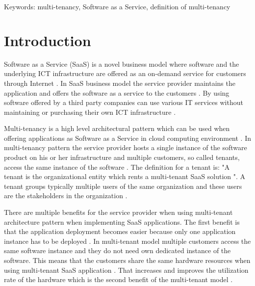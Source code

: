 \documentclass[conference]{sasmoota2017}
\begin{document}

Keywords: multi-tenancy, Software as a Service, definition of multi-tenancy



\IEEEpeerreviewmaketitle



\section{Introduction}

Software as a Service (SaaS) is a novel business model where software and the underlying ICT infrastructure are offered as an on-demand service for customers through Internet \cite{Bezemer:2010:MaintenanceDream}. In SaaS business model the service provider maintains the application and offers the software as a service to the customers \cite{Bezemer:2010:MaintenanceDream}. By using software offered by a third party companies can use various IT services without maintaining or purchasing their own ICT infrastructure \cite{Bezemer:2010:MaintenanceDream}. 

Multi-tenancy is a high level architectural pattern which can be used when offering applications as Software as a Service in cloud computing environment \cite{Kabbedijk2015:Defining}. In multi-tenancy pattern the service provider hosts a single instance of the software product on his or her infrastructure and multiple customers, so called tenants, access the same instance of the software \cite{Bezemer:2010:MaintenanceDream}. The definition for a tenant is: "A tenant is the organizational entity which rents a multi-tenant SaaS solution \cite{Bezemer:2010:MaintenanceDream}". A tenant groups typically multiple users of the same organization and these users are the stakeholders in the organization \cite{Bezemer:2010:MaintenanceDream}. 

There are multiple benefits for the service provider when using multi-tenant architecture pattern when implementing SaaS applications. The first benefit is that the application deployment becomes easier because only one application instance has to be deployed \cite{Bezemer:2010:MaintenanceDream}. In multi-tenant model multiple customers access the same software instance and they do not need own dedicated instance of the software. This means that the customers share the same hardware resources when using multi-tenant SaaS application \cite{Guo:2007:FrameworkForNative}. That increases and improves the utilization rate of the hardware which is the second benefit of the multi-tenant model \cite{Bezemer:2010:MaintenanceDream}. 
\end{document}
